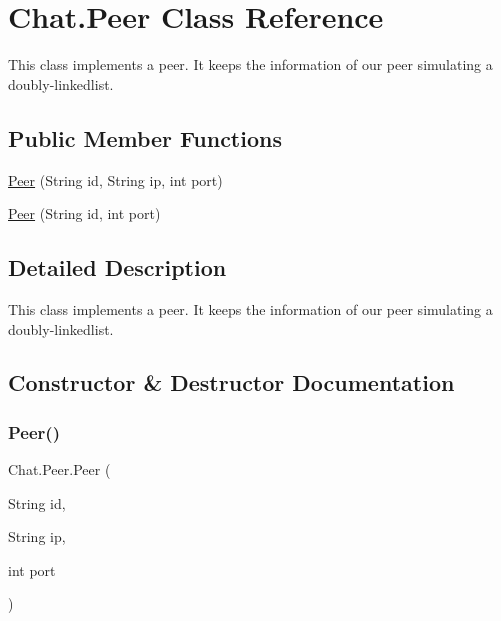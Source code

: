 \hypertarget{class_chat_1_1_peer}{}\section{Chat.\+Peer Class Reference}
\label{class_chat_1_1_peer}


This class implements a peer. It keeps the information of our peer simulating a doubly-\/linkedlist.  


\subsection*{Public Member Functions}
\begin{DoxyCompactItemize}
\item 
\hyperlink{class_chat_1_1_peer_a1ec840ef8993a9ac190db6d6f92b6c01}{Peer} (String id, String ip, int port)
\item 
\hyperlink{class_chat_1_1_peer_a9375050c0c6930ac28dc49cd9ded1029}{Peer} (String id, int port)
\end{DoxyCompactItemize}


\subsection{Detailed Description}
This class implements a peer. It keeps the information of our peer simulating a doubly-\/linkedlist. 

\subsection{Constructor \& Destructor Documentation}
\hypertarget{class_chat_1_1_peer_a1ec840ef8993a9ac190db6d6f92b6c01}{}\label{class_chat_1_1_peer_a1ec840ef8993a9ac190db6d6f92b6c01} 
\subsubsection{\texorpdfstring{Peer()}{Peer()}\hspace{0.1cm}{\footnotesize\ttfamily [1/2]}}
{\footnotesize\ttfamily Chat.\+Peer.\+Peer (\begin{DoxyParamCaption}\item[{String}]{id,  }\item[{String}]{ip,  }\item[{int}]{port }\end{DoxyParamCaption})}

